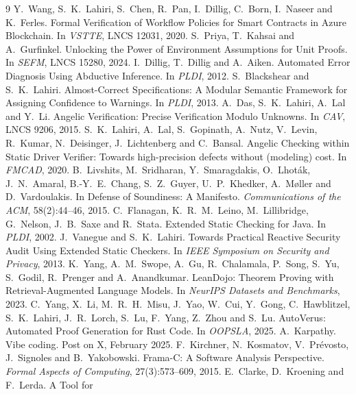 \documentclass[11pt,letterpaper]{article}
\begin{document}
\begin{thebibliography}{9}
 Y.~Wang, S.~K.~Lahiri, S.~Chen, R.~Pan, I.~Dillig,
  C.~Born, I.~Naseer and K.~Ferles. Formal Verification of Workflow Policies
  for Smart Contracts in Azure Blockchain. In \emph{VSTTE}, LNCS 12031, 2020.
 S.~Priya, T.~Kahsai and A.~Gurfinkel. Unlocking
  the Power of Environment Assumptions for Unit Proofs. In \emph{SEFM}, LNCS
  15280, 2024.
 I.~Dillig, T.~Dillig and A.~Aiken. Automated
  Error Diagnosis Using Abductive Inference. In \emph{PLDI}, 2012.
 S.~Blackshear and S.~K.~Lahiri. Almost-Correct
  Specifications: A Modular Semantic Framework for Assigning Confidence to
  Warnings. In \emph{PLDI}, 2013.
 A.~Das, S.~K.~Lahiri, A.~Lal and Y.~Li. Angelic
  Verification: Precise Verification Modulo Unknowns. In \emph{CAV}, LNCS 9206,
  2015.
 S.~K.~Lahiri, A.~Lal, S.~Gopinath, A.~Nutz,
  V.~Levin, R.~Kumar, N.~Deisinger, J.~Lichtenberg and C.~Bansal. Angelic
  Checking within Static Driver Verifier: Towards high-precision defects without
  (modeling) cost. In \emph{FMCAD}, 2020.
 B.~Livshits, M.~Sridharan, Y.~Smaragdakis,
  O.~Lhot{\'a}k, J.~N.~Amaral, B.-Y.~E.~Chang, S.~Z.~Guyer, U.~P.~Khedker,
  A.~M{\o}ller and D.~Vardoulakis. In Defense of Soundiness: A Manifesto.
  \emph{Communications of the ACM}, 58(2):44--46, 2015.
 C.~Flanagan, K.~R.~M.~Leino, M.~Lillibridge,
  G.~Nelson, J.~B.~Saxe and R.~Stata. Extended Static Checking for Java. In
  \emph{PLDI}, 2002.
 J.~Vanegue and S.~K.~Lahiri. Towards Practical
  Reactive Security Audit Using Extended Static Checkers. In \emph{IEEE
  Symposium on Security and Privacy}, 2013.
 K.~Yang, A.~M.~Swope, A.~Gu, R.~Chalamala, P.~Song,
  S.~Yu, S.~Godil, R.~Prenger and A.~Anandkumar. LeanDojo: Theorem Proving with
  Retrieval-Augmented Language Models. In \emph{NeurIPS Datasets and
  Benchmarks}, 2023.
 C.~Yang, X.~Li, M.~R.~H.~Misu, J.~Yao, W.~Cui,
  Y.~Gong, C.~Hawblitzel, S.~K.~Lahiri, J.~R.~Lorch, S.~Lu, F.~Yang, Z.~Zhou
  and S.~Lu. AutoVerus: Automated Proof Generation for Rust Code. In
  \emph{OOPSLA}, 2025.
 A.~Karpathy. Vibe coding. Post on X, February 2025.
 F.~Kirchner, N.~Kosmatov, V.~Pr\'evosto,
  J.~Signoles and B.~Yakobowski. Frama-C: A Software Analysis Perspective.
  \emph{Formal Aspects of Computing}, 27(3):573--609, 2015.
 E.~Clarke, D.~Kroening and F.~Lerda. A Tool for

\end{thebibliography}
\end{document}
